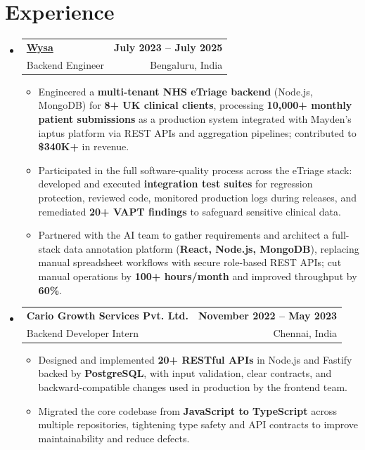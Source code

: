 \documentclass[letterpaper,10pt]{article}
\makeatletter
\newcommand{\resumeItem}[1]{
  \item\small{#1\vspace{-1pt}}
}
\newcommand{\resumeSubheading}[4]{
  \vspace{1pt}\item
    \begin{tabular*}{0.985\textwidth}[t]{l@{\extracolsep{\fill}}r}
      \textbf{#1} & \textbf{\small #2} \\
      {\small\color{ResumeSlate} #3} & {\small\color{ResumeSlate} #4} \\
    \end{tabular*}\vspace{-6pt}
}
\newcommand{\resumeSubHeadingListStart}{\begin{itemize}[leftmargin=0.0in, label={}, itemsep=2pt, topsep=2pt]}
\newcommand{\resumeSubHeadingListEnd}{\end{itemize}}
\newcommand{\resumeItemListStart}{\begin{itemize}[leftmargin=0.18in, itemsep=2pt, topsep=1pt]}
\newcommand{\resumeItemListEnd}{\end{itemize}\vspace{-4pt}}
\makeatother
\begin{document}
\section{Experience}
\resumeSubHeadingListStart
  \resumeSubheading
    {\href{https://www.wysa.io}{Wysa}}{July 2023 -- July 2025}
    {Backend Engineer}{Bengaluru, India}
    \resumeItemListStart
      \resumeItem{Engineered a \textbf{multi-tenant NHS eTriage backend} (Node.js, MongoDB) for \textbf{8+ UK clinical clients}, processing \textbf{10{,}000+ monthly patient submissions} as a production system integrated with Mayden's iaptus platform via REST APIs and aggregation pipelines; contributed to \textbf{\$340K+} in revenue.}
      \resumeItem{Participated in the full software-quality process across the eTriage stack: developed and executed \textbf{integration test suites} for regression protection, reviewed code, monitored production logs during releases, and remediated \textbf{20+ VAPT findings} to safeguard sensitive clinical data.}
      \resumeItem{Partnered with the AI team to gather requirements and architect a full-stack data annotation platform (\textbf{React, Node.js, MongoDB}), replacing manual spreadsheet workflows with secure role-based REST APIs; cut manual operations by \textbf{100+ hours/month} and improved throughput by \textbf{60\%}.}
    \resumeItemListEnd
  \resumeSubheading
    {Cario Growth Services Pvt. Ltd.}{November 2022 -- May 2023}
    {Backend Developer Intern}{Chennai, India}
    \resumeItemListStart
      \resumeItem{Designed and implemented \textbf{20+ RESTful APIs} in Node.js and Fastify backed by \textbf{PostgreSQL}, with input validation, clear contracts, and backward-compatible changes used in production by the frontend team.}
      \resumeItem{Migrated the core codebase from \textbf{JavaScript to TypeScript} across multiple repositories, tightening type safety and API contracts to improve maintainability and reduce defects.}
    \resumeItemListEnd
\resumeSubHeadingListEnd
\vspace{-4pt}
\end{document}
